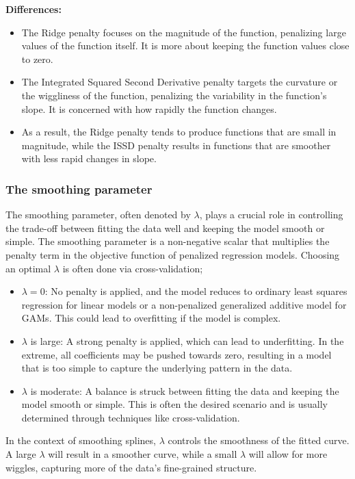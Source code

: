\textbf{Differences:}
\begin{itemize}
    \item The Ridge penalty focuses on the magnitude of the function, penalizing large values of the function itself. It is more about keeping the function values close to zero.
    \item The Integrated Squared Second Derivative penalty targets the curvature or the wiggliness of the function, penalizing the variability in the function's slope. It is concerned with how rapidly the function changes.
    \item As a result, the Ridge penalty tends to produce functions that are small in magnitude, while the ISSD penalty results in functions that are smoother with less rapid changes in slope.
\end{itemize}

\subsubsection{The smoothing parameter}

The smoothing parameter, often denoted by \( \lambda \), plays a crucial role in controlling the trade-off between fitting the data well and keeping the model smooth or simple. The smoothing parameter is a non-negative scalar that multiplies the penalty term in the objective function of penalized regression models. Choosing an optimal \( \lambda \) is often done via cross-validation;


\begin{itemize}
    \item \( \lambda = 0 \): No penalty is applied, and the model reduces to ordinary least squares regression for linear models or a non-penalized generalized additive model for GAMs. This could lead to overfitting if the model is complex.
    \item \( \lambda \) is large: A strong penalty is applied, which can lead to underfitting. In the extreme, all coefficients may be pushed towards zero, resulting in a model that is too simple to capture the underlying pattern in the data.
    \item \( \lambda \) is moderate: A balance is struck between fitting the data and keeping the model smooth or simple. This is often the desired scenario and is usually determined through techniques like cross-validation.
\end{itemize}

In the context of smoothing splines, \( \lambda \) controls the smoothness of the fitted curve. A large \( \lambda \) will result in a smoother curve, while a small \( \lambda \) will allow for more wiggles, capturing more of the data's fine-grained structure.

